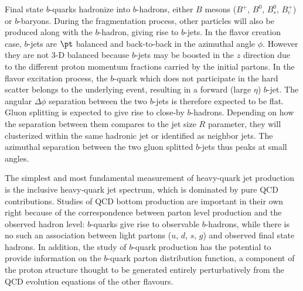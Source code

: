 Final state $b$-quarks hadronize into $b$-hadrons, either $B$ mesons ($B^+$, $B^0$, $B^0_s$, $B^+_c$) or $b$-baryons. During the fragmentation process, other particles will also be produced along with the $b$-hadron, giving rise to $b$-jets. In the flavor creation case, $b$-jets are $\pt$ balanced and back-to-back in the azimuthal angle $\phi$. However they are not 3-D balanced because $b$-jets may be boosted in the $z$ direction due to the different proton momentum fractions carried by the initial partons.  In the flavor excitation process, the $b$-quark which does not participate in the hard scatter belongs to the underlying event, resulting in a forward (large $\eta$) $b$-jet.  The angular $\Delta \phi$ separation between the two $b$-jets is therefore expected to be flat.  Gluon splitting is expected to give rise to close-by $b$-hadrons. Depending on how the separation between them compares to the jet size $R$ parameter, they will clusterized within the same hadronic jet or identified as neighbor jets. The azimuthal separation between the two gluon splitted $b$-jets thus peaks at small angles.




The simplest and most fundamental measurement of heavy-quark jet production is
the inclusive heavy-quark jet spectrum, which is dominated by pure QCD contributions. 
Studies of QCD bottom production are important in their own right because of the correspondence between parton level production and the observed hadron level: $b$-quarks give rise to observable $b$-hadrons, while there is no such an association between light partons ($u$, $d$, $s$, $g$) and observed final state hadrons. In addition, the study of $b$-quark production has the potential to provide information on the $b$-quark parton distribution function, a component of the proton structure thought to be generated entirely perturbatively from the QCD evolution equations of the other flavours. 

